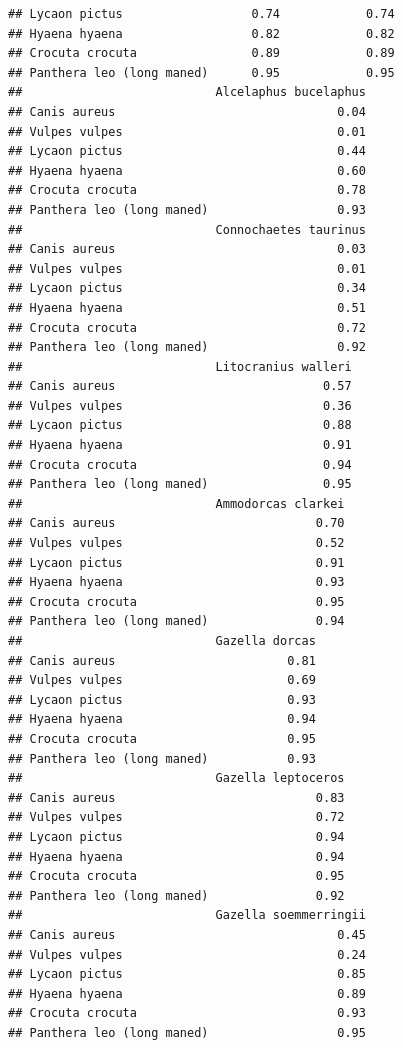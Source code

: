 \documentclass[
]{article}
\begin{document}
\begin{verbatim}
## Lycaon pictus                  0.74            0.74
## Hyaena hyaena                  0.82            0.82
## Crocuta crocuta                0.89            0.89
## Panthera leo (long maned)      0.95            0.95
##                           Alcelaphus bucelaphus
## Canis aureus                               0.04
## Vulpes vulpes                              0.01
## Lycaon pictus                              0.44
## Hyaena hyaena                              0.60
## Crocuta crocuta                            0.78
## Panthera leo (long maned)                  0.93
##                           Connochaetes taurinus
## Canis aureus                               0.03
## Vulpes vulpes                              0.01
## Lycaon pictus                              0.34
## Hyaena hyaena                              0.51
## Crocuta crocuta                            0.72
## Panthera leo (long maned)                  0.92
##                           Litocranius walleri
## Canis aureus                             0.57
## Vulpes vulpes                            0.36
## Lycaon pictus                            0.88
## Hyaena hyaena                            0.91
## Crocuta crocuta                          0.94
## Panthera leo (long maned)                0.95
##                           Ammodorcas clarkei
## Canis aureus                            0.70
## Vulpes vulpes                           0.52
## Lycaon pictus                           0.91
## Hyaena hyaena                           0.93
## Crocuta crocuta                         0.95
## Panthera leo (long maned)               0.94
##                           Gazella dorcas
## Canis aureus                        0.81
## Vulpes vulpes                       0.69
## Lycaon pictus                       0.93
## Hyaena hyaena                       0.94
## Crocuta crocuta                     0.95
## Panthera leo (long maned)           0.93
##                           Gazella leptoceros
## Canis aureus                            0.83
## Vulpes vulpes                           0.72
## Lycaon pictus                           0.94
## Hyaena hyaena                           0.94
## Crocuta crocuta                         0.95
## Panthera leo (long maned)               0.92
##                           Gazella soemmerringii
## Canis aureus                               0.45
## Vulpes vulpes                              0.24
## Lycaon pictus                              0.85
## Hyaena hyaena                              0.89
## Crocuta crocuta                            0.93
## Panthera leo (long maned)                  0.95

\end{verbatim}
\end{document}
